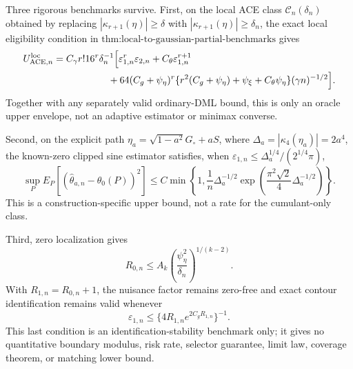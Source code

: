 Three rigorous benchmarks survive.  First, on the local ACE class \(\mathcal C_n(\delta_n)\) obtained by replacing \(|\kappa_{r+1}(\eta)|\ge\delta\) with \(|\kappa_{r+1}(\eta)|\ge\delta_n\), the exact local eligibility condition in \(\text{thm:local-to-gaussian-partial-benchmarks}\) gives
\[
\begin{aligned}
 U_{\mathrm{ACE},n}^{\mathrm{loc}}
 &=C_{\gamma}r!16^r\delta_n^{-1}
 \Bigl[
   \varepsilon_{1,n}^r\varepsilon_{2,n}
   +C_{\theta}\varepsilon_{1,n}^{r+1}\\
 &\hspace{20mm}
   +64(C_g+\psi_{\eta})^r
    \{r^2(C_g+\psi_{\eta})+\psi_{\xi}+C_{\theta}\psi_{\eta}\}
    (\gamma n)^{-1/2}
 \Bigr].
\end{aligned}
\]
Together with any separately valid ordinary-DML bound, this is only an oracle upper envelope, not an adaptive estimator or minimax converse.

Second, on the explicit path \(\eta_a=\sqrt{1-a^2}G_{\circ}+aS\), where \(\Delta_a=|\kappa_4(\eta_a)|=2a^4\), the known-zero clipped sine estimator satisfies, when \(\varepsilon_{1,n}\le\Delta_a^{1/4}/(2^{1/4}\pi)\),
\[
 \sup_P E_P[(\widehat\theta_{a,n}-\theta_0(P))^2]
 \le C\min\!\left\{
  1,\frac1n\Delta_a^{-1/2}
  \exp\!\left(\frac{\pi^2\sqrt2}{4}\Delta_a^{-1/2}\right)
 \right\}.
\]
This is a construction-specific upper bound, not a rate for the cumulant-only class.

Third, zero localization gives
\[
 R_{0,n}\le A_k
 \left(\frac{\psi_{\eta}^2}{\delta_n}\right)^{1/(k-2)}.
\]
With \(R_{1,n}=R_{0,n}+1\), the nuisance factor remains zero-free and exact contour identification remains valid whenever
\[
 \varepsilon_{1,n}
 \le\{4R_{1,n}e^{2C_gR_{1,n}}\}^{-1}.
\]
This last condition is an identification-stability benchmark only; it gives no quantitative boundary modulus, risk rate, selector guarantee, limit law, coverage theorem, or matching lower bound.